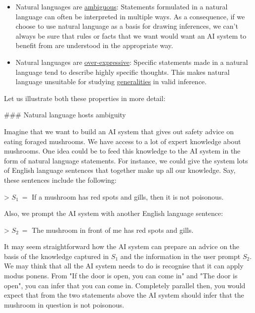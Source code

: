 \documentclass[11pt]{article}
\begin{document}
\begin{itemize}
\item Natural languages are \uline{ambiguous}: Statements formulated in a natural language can often be interpreted in multiple ways. As a consequence, if we choose to use natural language as a basis for drawing inferences, we can't always be sure that rules or facts that we want would want an AI system to benefit from are understood in the appropriate way.

\item Natural languages are \uline{over-expressive}: Specific statements made in a natural language tend to describe highly specific thoughts. This makes natural language unsuitable for studying \uline{generalities} in valid inference.
\end{itemize}

Let us illustrate both these properties in more detail:

\#\#\# Natural language hosts ambiguity

Imagine that we want to build an AI system that gives out safety advice on eating foraged mushrooms. We have access to a lot of expert knowledge about mushrooms. One idea could be to feed this knowledge to the AI system in the form of natural language statements. For instance, we could give the system lots of English language sentences that together make up all our knowledge. Say, these sentences include the following:

> \(S_1\ =\) If a mushroom has red spots and gills, then it is not poisonous.

Also, we prompt the AI system with another English language sentence:

> \(S_2\ =\) The mushroom in front of me has red spots and gills.

It may seem straightforward how the AI system can prepare an advice on the basis of the knowledge captured in \(S_1\) and the information in the user prompt \(S_2\). We may think that all the AI system needs to do is recognise that it can apply modus ponens. From "If the door is open, you can come in" and "The door is open", you can infer that you can come in. Completely parallel then, you would expect that from the two statements above the AI system should infer that the mushroom in question is not poisonous. 
\end{document}

